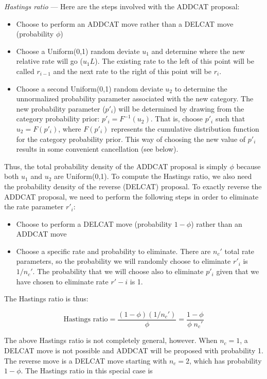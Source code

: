 \documentclass[12pt]{article}
\newcommand{\ncat}{n_c}
\begin{document}
{\em Hastings ratio} --- Here are the steps involved with the ADDCAT proposal:
\begin{itemize}
\item Choose to perform an ADDCAT move rather than a DELCAT move (probability $\phi$)
\item Choose a Uniform(0,1) random deviate $u_1$ and determine where the new relative rate will go ($u_1 L$). The existing rate to the left of this point will be called $r_{i-1}$ and the next rate to the right of this point will be $r_i$.
\item Choose a second Uniform(0,1) random deviate $u_2$ to determine the unnormalized probability parameter associated with the new category. The new probability parameter ($p'_i$) will be determined by drawing from the category probability prior: $p'_i = F^{-1}(u_2)$. That is, choose $p'_i$ such that $u_2 = F(p'_i)$, where $F(p'_i)$ represents the cumulative distribution function for the category probability prior. This way of choosing the new value of $p'_i$ results in some convenient cancellation (see below).
\end{itemize}

Thus, the total probability density of the ADDCAT proposal is simply $\phi$ because both $u_1$ and $u_2$ are Uniform(0,1). To compute the Hastings ratio, we also need the probability density of the reverse (DELCAT) proposal. To exactly reverse the ADDCAT proposal, we need to perform the following steps in order to eliminate the rate parameter $r'_i$:

\begin{itemize}
\item Choose to perform a DELCAT move (probability $1-\phi$) rather than an ADDCAT move 
\item Choose a specific rate and probability to eliminate. There are $\ncat'$ total rate parameters, so the probability we will randomly choose to eliminate $r'_i$ is $1/\ncat'$. The probability that we will choose also to eliminate $p'_i$ given that we have chosen to eliminate rate $r'-i$ is 1.
\end{itemize}

The Hastings ratio is thus:

\[ \mbox{Hastings ratio} = \frac{(1-\phi)(1/\ncat')}{\phi} = \frac{1-\phi}{\phi \; \ncat'} \]

The above Hastings ratio is not completely general, however. When $\ncat = 1$, a DELCAT move is not possible and ADDCAT will be proposed with probability 1. The reverse move is a DELCAT move starting with $\ncat = 2$, which has probability $1 - \phi$. The Hastings ratio in this special case is
\end{document}
